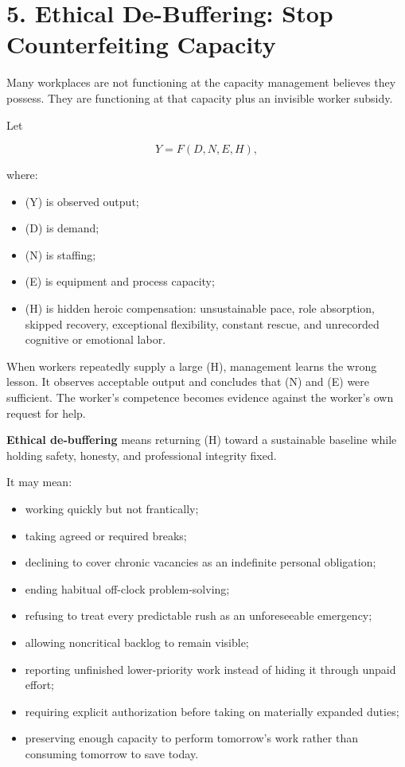 \documentclass[11pt,oneside]{article}
\providecommand{\tightlist}{%
  \setlength{\itemsep}{0.22em}\setlength{\parskip}{0pt}}
\begin{document}
\section{5. Ethical De-Buffering: Stop Counterfeiting Capacity}\label{ethical-de-buffering-stop-counterfeiting-capacity}

Many workplaces are not functioning at the capacity management believes they possess. They are functioning at that capacity plus an invisible worker subsidy.

Let

\[
Y = F(D,N,E,H),
\]

where:

\begin{itemize}
\tightlist
\item
  (Y) is observed output;
\item
  (D) is demand;
\item
  (N) is staffing;
\item
  (E) is equipment and process capacity;
\item
  (H) is hidden heroic compensation: unsustainable pace, role absorption, skipped recovery, exceptional flexibility, constant rescue, and unrecorded cognitive or emotional labor.
\end{itemize}

When workers repeatedly supply a large (H), management learns the wrong lesson. It observes acceptable output and concludes that (N) and (E) were sufficient. The worker's competence becomes evidence against the worker's own request for help.

\textbf{Ethical de-buffering} means returning (H) toward a sustainable baseline while holding safety, honesty, and professional integrity fixed.

It may mean:

\begin{itemize}
\tightlist
\item
  working quickly but not frantically;
\item
  taking agreed or required breaks;
\item
  declining to cover chronic vacancies as an indefinite personal obligation;
\item
  ending habitual off-clock problem-solving;
\item
  refusing to treat every predictable rush as an unforeseeable emergency;
\item
  allowing noncritical backlog to remain visible;
\item
  reporting unfinished lower-priority work instead of hiding it through unpaid effort;
\item
  requiring explicit authorization before taking on materially expanded duties;
\item
  preserving enough capacity to perform tomorrow's work rather than consuming tomorrow to save today.
\end{itemize}
\end{document}
